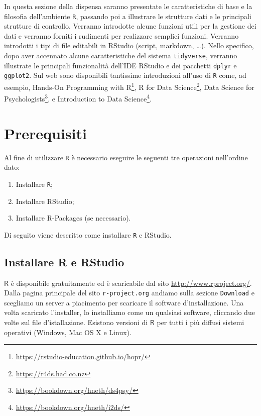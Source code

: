 \documentclass[
  11pt,
]{krantz}
\providecommand{\tightlist}{%
  \setlength{\itemsep}{0pt}\setlength{\parskip}{0pt}}
\renewcommand{\href}[2]{#2\footnote{\url{#1}}}
\newcommand{\R}{\textsf{R}} %
\theoremstyle{definition}
\theoremstyle{definition}
\theoremstyle{definition}
\theoremstyle{definition}
\theoremstyle{remark}
\begin{document}
In questa sezione della dispensa saranno presentate le caratteristiche di base e la filosofia dell'ambiente \texttt{R}, passando poi a illustrare le strutture dati e le principali strutture di controllo. Verranno introdotte alcune funzioni utili per la gestione dei dati e verranno forniti i rudimenti per realizzare semplici funzioni. Verranno introdotti i tipi di file editabili in RStudio (script, markdown, \ldots). Nello specifico, dopo aver accennato alcune caratteristiche del sistema \texttt{tidyverse}, verranno illustrate le principali funzionalità dell'IDE RStudio e dei pacchetti \texttt{dplyr} e \texttt{ggplot2}. Sul web sono disponibili tantissime introduzioni all'uso di \texttt{R} come, ad esempio, \href{https://rstudio-education.github.io/hopr/}{Hands-On Programming with R}, \href{https://r4ds.had.co.nz}{R for Data Science}, \href{https://bookdown.org/hneth/ds4psy/}{Data Science for Psychologists}, e \href{https://bookdown.org/hneth/i2ds/}{Introduction to Data Science}.

\hypertarget{prerequisiti}{%
\section{Prerequisiti}\label{prerequisiti}}

Al fine di utilizzare \texttt{R} è necessario eseguire le seguenti tre operazioni nell'ordine dato:

\begin{enumerate}
\def\labelenumi{\arabic{enumi}.}
\tightlist
\item
  Installare \texttt{R};
\item
  Installare RStudio;
\item
  Installare R-Packages (se necessario).
\end{enumerate}

Di seguito viene descritto come installare \texttt{R} e RStudio.

\hypertarget{installare-r-e-rstudio}{%
\subsection{Installare R e RStudio}\label{installare-r-e-rstudio}}

\(\R\) è disponibile gratuitamente ed è scaricabile dal sito \url{http://www.rproject.org/}. Dalla pagina principale del sito \texttt{r-project.org} andiamo sulla sezione \texttt{Download} e scegliamo un server a piacimento per scaricare il software d'installazione. Una volta scaricato l'installer, lo installiamo come un qualsiasi software, cliccando due volte sul file d'istallazione. Esistono versioni di \(\R\) per tutti i più diffusi sistemi operativi (Windows, Mac OS X e Linux).
\end{document}
